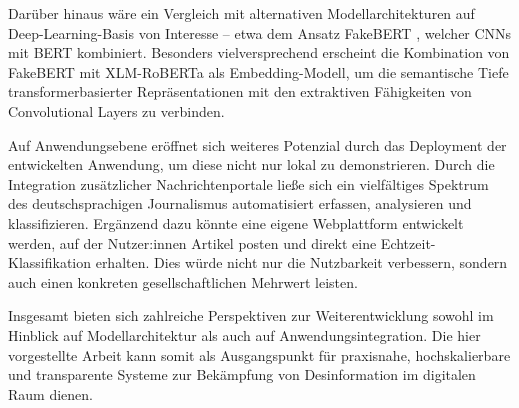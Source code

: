Darüber hinaus wäre ein Vergleich mit alternativen Modellarchitekturen auf Deep-Learning-Basis von Interesse – etwa dem Ansatz FakeBERT \cite{Kaliyar:2021aa}, 
welcher CNNs mit BERT kombiniert. Besonders vielversprechend erscheint die Kombination von FakeBERT mit XLM-RoBERTa als Embedding-Modell,
um die semantische Tiefe transformerbasierter Repräsentationen mit den extraktiven Fähigkeiten von Convolutional Layers zu verbinden.

Auf Anwendungsebene eröffnet sich weiteres Potenzial durch das Deployment der entwickelten Anwendung, um diese nicht nur lokal zu demonstrieren.
Durch die Integration zusätzlicher Nachrichtenportale ließe sich ein vielfältiges Spektrum des deutschsprachigen Journalismus automatisiert erfassen, 
analysieren und klassifizieren.
Ergänzend dazu könnte eine eigene Webplattform entwickelt werden, auf der Nutzer:innen Artikel posten und direkt eine Echtzeit-Klassifikation 
erhalten. Dies würde nicht nur die Nutzbarkeit verbessern, sondern auch einen konkreten gesellschaftlichen Mehrwert leisten.

Insgesamt bieten sich zahlreiche Perspektiven zur Weiterentwicklung sowohl im Hinblick auf Modellarchitektur als auch auf Anwendungsintegration. 
Die hier vorgestellte Arbeit kann somit als Ausgangspunkt für praxisnahe, hochskalierbare und transparente Systeme zur Bekämpfung von Desinformation 
im digitalen Raum dienen.

